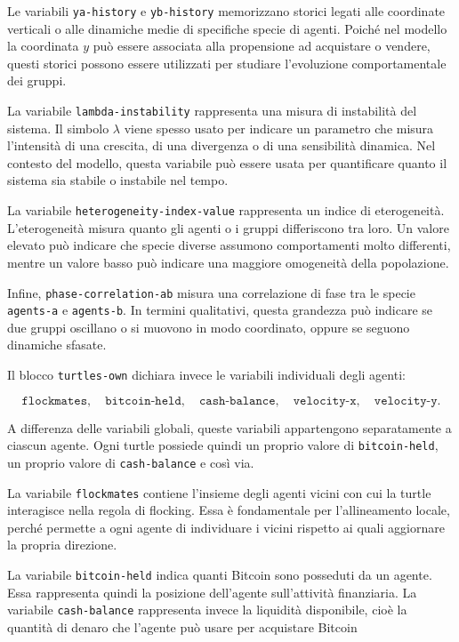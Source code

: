 Le variabili \texttt{ya-history} e \texttt{yb-history} memorizzano storici legati
alle coordinate verticali o alle dinamiche medie di specifiche specie di agenti.
Poiché nel modello la coordinata \(y\) può essere associata alla propensione ad
acquistare o vendere, questi storici possono essere utilizzati per studiare
l'evoluzione comportamentale dei gruppi.

La variabile \texttt{lambda-instability} rappresenta una misura di instabilità
del sistema. Il simbolo \(\lambda\) viene spesso usato per indicare un parametro
che misura l'intensità di una crescita, di una divergenza o di una sensibilità
dinamica. Nel contesto del modello, questa variabile può essere usata per
quantificare quanto il sistema sia stabile o instabile nel tempo.

La variabile \texttt{heterogeneity-index-value} rappresenta un indice di
eterogeneità. L'eterogeneità misura quanto gli agenti o i gruppi differiscono tra
loro. Un valore elevato può indicare che specie diverse assumono comportamenti
molto differenti, mentre un valore basso può indicare una maggiore omogeneità
della popolazione.

Infine, \texttt{phase-correlation-ab} misura una correlazione di fase tra le
specie \texttt{agents-a} e \texttt{agents-b}. In termini qualitativi, questa
grandezza può indicare se due gruppi oscillano o si muovono in modo coordinato,
oppure se seguono dinamiche sfasate.

Il blocco \texttt{turtles-own} dichiara invece le variabili individuali degli
agenti:

\[
\texttt{flockmates},
\quad
\texttt{bitcoin-held},
\quad
\texttt{cash-balance},
\quad
\texttt{velocity-x},
\quad
\texttt{velocity-y}.
\]

A differenza delle variabili globali, queste variabili appartengono
separatamente a ciascun agente. Ogni turtle possiede quindi un proprio valore di
\texttt{bitcoin-held}, un proprio valore di \texttt{cash-balance} e così via.

La variabile \texttt{flockmates} contiene l'insieme degli agenti vicini con cui
la turtle interagisce nella regola di flocking. Essa è fondamentale per
l'allineamento locale, perché permette a ogni agente di individuare i vicini
rispetto ai quali aggiornare la propria direzione.

La variabile \texttt{bitcoin-held} indica quanti Bitcoin sono posseduti da un
agente. Essa rappresenta quindi la posizione dell'agente sull'attività
finanziaria. La variabile \texttt{cash-balance} rappresenta invece la liquidità
disponibile, cioè la quantità di denaro che l'agente può usare per acquistare
Bitcoin


